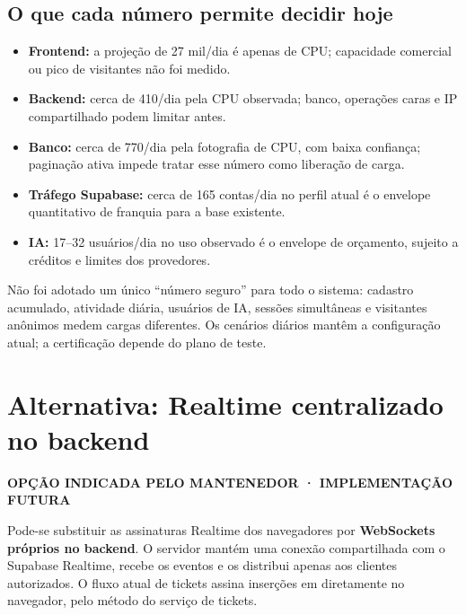 \documentclass[10pt,a4paper]{article}
\newcommand{\code}[1]{{\ttfamily\footnotesize\detokenize{#1}}}
\newcommand{\smallnote}[1]{\par{\footnotesize\color{NFMuted}#1\par}}
\newcommand{\pagechapter}[1]{\clearpage\section{#1}}
\newcommand{\tagline}[1]{{\footnotesize\bfseries\color{NFPrimary}#1\par}\vspace{3mm}}
\begin{document}
\subsection{O que cada número permite decidir hoje}
\begin{itemize}
\item \textbf{Frontend:} a projeção de 27 mil/dia é apenas de CPU; capacidade comercial ou pico de visitantes não foi medido.
\item \textbf{Backend:} cerca de 410/dia pela CPU observada; banco, operações caras e IP compartilhado podem limitar antes.
\item \textbf{Banco:} cerca de 770/dia pela fotografia de CPU, com baixa confiança; paginação ativa impede tratar esse número como liberação de carga.
\item \textbf{Tráfego Supabase:} cerca de 165 contas/dia no perfil atual é o envelope quantitativo de franquia para a base existente.
\item \textbf{IA:} 17–32 usuários/dia no uso observado é o envelope de orçamento, sujeito a créditos e limites dos provedores.
\end{itemize}
\smallnote{Não foi adotado um único ``número seguro'' para todo o sistema: cadastro acumulado, atividade diária, usuários de IA, sessões simultâneas e visitantes anônimos medem cargas diferentes. Os cenários diários mantêm a configuração atual; a certificação depende do plano de teste.}

\pagechapter{Alternativa: Realtime centralizado no backend}
\tagline{OPÇÃO INDICADA PELO MANTENEDOR · IMPLEMENTAÇÃO FUTURA}
Pode-se substituir as assinaturas Realtime dos navegadores por \textbf{WebSockets próprios no backend}. O servidor mantém uma conexão compartilhada com o Supabase Realtime, recebe os eventos e os distribui apenas aos clientes autorizados. O fluxo atual de tickets assina inserções em \code{ticket_messages} diretamente no navegador, pelo método \code{subscribeToMessages} do serviço de tickets.

\begin{center}
\end{center}
\end{document}
